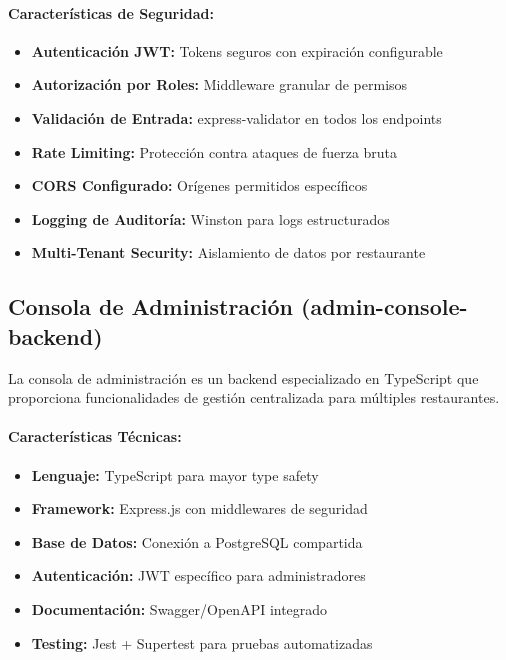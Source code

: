\documentclass[12pt,a4paper]{article}
\begin{document}
\paragraph{Características de Seguridad:}
\begin{itemize}
    \item \textbf{Autenticación JWT:} Tokens seguros con expiración configurable
    \item \textbf{Autorización por Roles:} Middleware granular de permisos
    \item \textbf{Validación de Entrada:} express-validator en todos los endpoints
    \item \textbf{Rate Limiting:} Protección contra ataques de fuerza bruta
    \item \textbf{CORS Configurado:} Orígenes permitidos específicos
    \item \textbf{Logging de Auditoría:} Winston para logs estructurados
    \item \textbf{Multi-Tenant Security:} Aislamiento de datos por restaurante
\end{itemize}

\subsection{Consola de Administración (admin-console-backend)}

La consola de administración es un backend especializado en TypeScript que proporciona funcionalidades de gestión centralizada para múltiples restaurantes.

\paragraph{Características Técnicas:}
\begin{itemize}
    \item \textbf{Lenguaje:} TypeScript para mayor type safety
    \item \textbf{Framework:} Express.js con middlewares de seguridad
    \item \textbf{Base de Datos:} Conexión a PostgreSQL compartida
    \item \textbf{Autenticación:} JWT específico para administradores
    \item \textbf{Documentación:} Swagger/OpenAPI integrado
    \item \textbf{Testing:} Jest + Supertest para pruebas automatizadas
\end{itemize}
\end{document}
